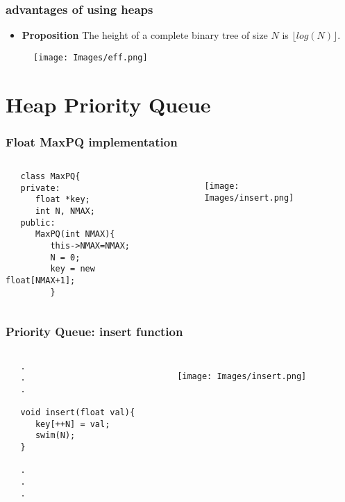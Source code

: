 \documentclass{beamer}
\begin{document}
\begin{frame}
\frametitle{advantages of using heaps}
\begin{itemize}
\item \textbf{Proposition} The height of a complete binary tree of size $N$ is $\lfloor log(N)\rfloor$.
\end{itemize}
\begin{figure}[h]
\texttt{[image: Images/eff.png]}
\centering
\end{figure}
\end{frame}


\section{Heap Priority Queue} 

\begin{frame}[fragile]
\frametitle{Float MaxPQ implementation}
\begin{columns}[c]

\begin{lstlisting}
   class MaxPQ{
   private:
      float *key;
      int N, NMAX;
   public:
      MaxPQ(int NMAX){
         this->NMAX=NMAX;
         N = 0;	
         key = new float[NMAX+1];
         }
\end{lstlisting}
\begin{figure}[h]
\texttt{[image: Images/insert.png]}
\centering
\end{figure}

\end{columns}
\end{frame}


\begin{frame}[fragile]
\frametitle{Priority Queue: insert function}
\begin{columns}[c]

\begin{lstlisting}
   .
   .
   .
   
   void insert(float val){
      key[++N] = val;
      swim(N);
   }

   .
   .
   .
\end{lstlisting}
\begin{figure}[h]
\texttt{[image: Images/insert.png]}
\centering
\end{figure}

\end{columns}
\end{frame}
\end{document}
